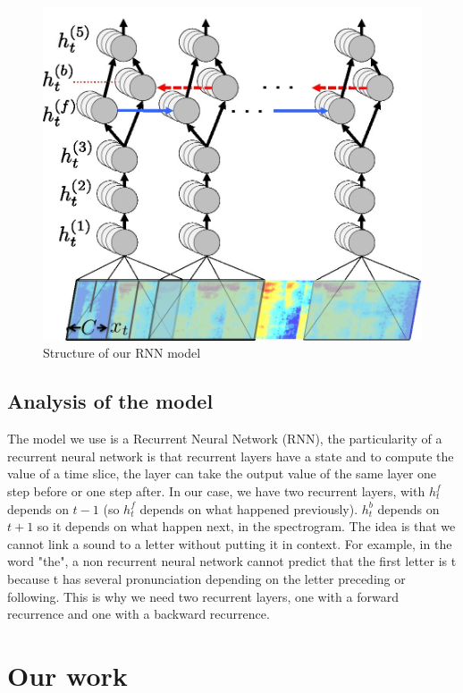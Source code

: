 \documentclass[12pt]{article}
\begin{document}
\begin{figure}[H]
  \begin{center}
    \includegraphics[scale=0.27]{images/photo.jpg}
    \caption{Structure of our RNN model}
  \end{center}
\end{figure}

\subsection{Analysis of the model}
The model we use is a Recurrent Neural Network (RNN), the particularity of a recurrent neural network is that recurrent layers have a state and to compute the value of a time slice, the layer can take the output value of the same layer one step before or one step after. In our case, we have two recurrent layers, with $h_t^f$ depends on $t-1$ (so $h_t^f$ depends on what happened previously). $h_t^b$ depends on $t+1$ so it depends on what happen next, in the spectrogram. The idea is that we cannot link a sound to a letter without putting it in context. For example, in the word "the", a non recurrent neural network cannot predict that the first letter is t because t has several pronunciation depending on the letter preceding or following. This is why we need two recurrent layers, one with a forward recurrence and one with a backward recurrence.


\section{Our work}
\end{document}
